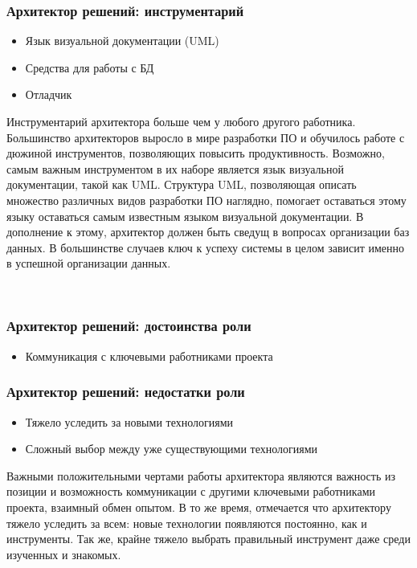 \documentclass{../industrial-development}
\begin{document}
\begin{frame} \frametitle{Архитектор решений: инструментарий}
  \begin{itemize}
	\item Язык визуальной документации (UML)
	\item Средства для работы с БД
	\item Отладчик
	\end{itemize}
\end{frame}

\lecturenotes

Инструментарий архитектора больше чем у любого другого работника. Большинство архитекторов выросло в мире разработки ПО и обучилось работе с дюжиной инструментов, позволяющих повысить продуктивность. 
Возможно, самым важным инструментом в их наборе является язык визуальной документации, такой как UML. Структура UML, позволяющая описать множество различных видов разработки ПО наглядно, помогает оставаться этому языку оставаться самым известным языком визуальной документации. 
В дополнение к этому, архитектор должен быть сведущ в вопросах организации баз данных. В большинстве случаев ключ к успеху системы в целом зависит именно в успешной организации данных. 

  ~\cite{Anatomy}

\begin{frame} \frametitle{Архитектор решений: достоинства роли}
  \begin{itemize}
	\item Коммуникация с ключевыми работниками проекта
	\end{itemize}
\end{frame}

\begin{frame} \frametitle{Архитектор решений: недостатки роли}
  \begin{itemize}
	\item Тяжело уследить за новыми технологиями
	\item Сложный выбор между уже существующими технологиями
	\end{itemize}
\end{frame}

\lecturenotes

Важными положительными чертами работы архитектора являются важность из позиции и возможность коммуникации с другими ключевыми работниками проекта, взаимный обмен опытом. В то же время, отмечается что архитектору тяжело уследить за всем: новые технологии появляются постоянно, как и инструменты. Так же, крайне тяжело выбрать правильный инструмент даже среди изученных и знакомых. 
\end{document}

